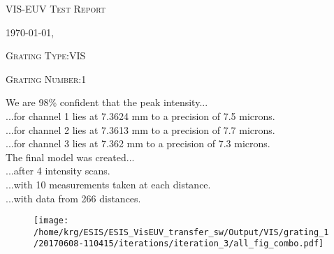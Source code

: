 \documentclass[12pt,a4paper]{article}
\begin{document}
\begin{center}
{\scshape\LARGE VIS-EUV Test Report \par}
{\scshape\Large \today, \currenttime \par}
\bigskip
{\scshape\large Grating Type:VIS \par}
{\scshape\large Grating Number:1 \par}
\end{center}
\noindent We are 98\% confident that the peak intensity...\\
\indent...for channel 1 lies at 7.3624 mm to a precision of 7.5 microns.\\
\indent...for channel 2 lies at 7.3613 mm to a precision of 7.7 microns.\\
\indent...for channel 3 lies at 7.362 mm to a precision of 7.3 microns.\\
\noindent The final model was created...\\
\indent...after 4 intensity scans.\\
\indent...with 10 measurements taken at each distance.\\
\indent...with data from 266 distances.\\
\begin{figure}[H]
\centering
\texttt{[image: /home/krg/ESIS/ESIS\_VisEUV\_transfer\_sw/Output/VIS/grating\_1/20170608-110415/iterations/iteration\_3/all\_fig\_combo.pdf]}\\
\end{figure}
\end{document}
